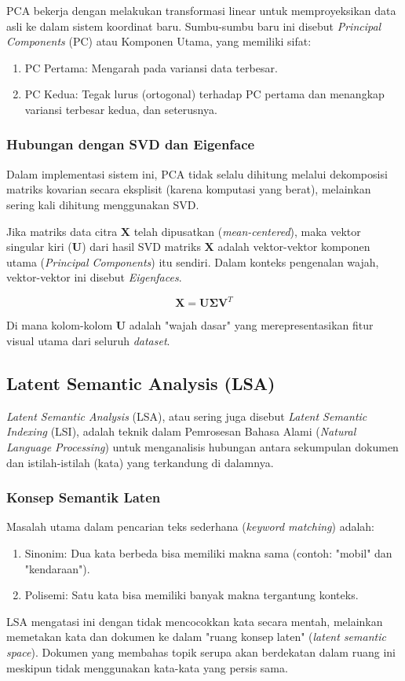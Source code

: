\documentclass[12pt,a4paper]{article}
\begin{document}
PCA bekerja dengan melakukan transformasi linear untuk memproyeksikan data asli ke dalam sistem koordinat baru. Sumbu-sumbu baru ini disebut \textit{Principal Components} (PC) atau Komponen Utama, yang memiliki sifat:

\begin{enumerate}
    \item PC Pertama: Mengarah pada variansi data terbesar.
    \item PC Kedua: Tegak lurus (ortogonal) terhadap PC pertama dan menangkap variansi terbesar kedua, dan seterusnya.
\end{enumerate}

\subsubsection{Hubungan dengan SVD dan Eigenface}
Dalam implementasi sistem ini, PCA tidak selalu dihitung melalui dekomposisi matriks kovarian secara eksplisit (karena komputasi yang berat), melainkan sering kali dihitung menggunakan SVD.

Jika matriks data citra $\mathbf{X}$ telah dipusatkan (\textit{mean-centered}), maka vektor singular kiri ($\mathbf{U}$) dari hasil SVD matriks $\mathbf{X}$ adalah vektor-vektor komponen utama (\textit{Principal Components}) itu sendiri. Dalam konteks pengenalan wajah, vektor-vektor ini disebut \textit{Eigenfaces}.

$$\mathbf{X} = \mathbf{U} \mathbf{\Sigma} \mathbf{V}^T$$

Di mana kolom-kolom $\mathbf{U}$ adalah "wajah dasar" yang merepresentasikan fitur visual utama dari seluruh \textit{dataset}.

\subsection{Latent Semantic Analysis (LSA)}
\textit{Latent Semantic Analysis} (LSA), atau sering juga disebut \textit{Latent Semantic Indexing} (LSI), adalah teknik dalam Pemrosesan Bahasa Alami (\textit{Natural Language Processing}) untuk menganalisis hubungan antara sekumpulan dokumen dan istilah-istilah (kata) yang terkandung di dalamnya.

\subsubsection{Konsep Semantik Laten}
Masalah utama dalam pencarian teks sederhana (\textit{keyword matching}) adalah:
\begin{enumerate}
    \item Sinonim: Dua kata berbeda bisa memiliki makna sama (contoh: "mobil" dan "kendaraan").
    \item Polisemi: Satu kata bisa memiliki banyak makna tergantung konteks.
\end{enumerate}
LSA mengatasi ini dengan tidak mencocokkan kata secara mentah, melainkan memetakan kata dan dokumen ke dalam "ruang konsep laten" (\textit{latent semantic space}). Dokumen yang membahas topik serupa akan berdekatan dalam ruang ini meskipun tidak menggunakan kata-kata yang persis sama.
\end{document}
